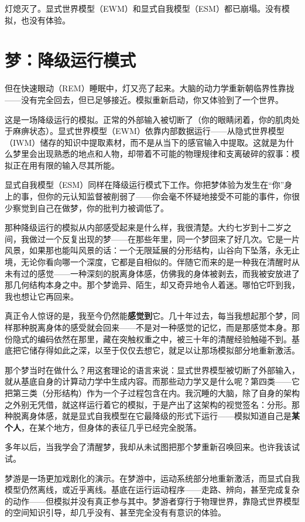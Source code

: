 \documentclass[11pt, twoside, openright]{book}
\begin{document}
灯熄灭了。显式世界模型（EWM）和显式自我模型（ESM）都已崩塌。没有模拟，也没有体验。

\section*{梦：降级运行模式}

但在快速眼动（REM）睡眠中，灯又亮了起来。大脑的动力学重新朝临界性靠拢------没有完全回去，但已足够接近。模拟重新启动，你又体验到了一个世界。

这是一场降级运行的模拟。正常的外部输入被切断了（你的眼睛闭着，你的肌肉处于麻痹状态）。显式世界模型（EWM）依靠内部数据运行------从隐式世界模型（IWM）储存的知识中提取素材，而不是从当下的感官输入中提取。这就是为什么梦里会出现熟悉的地点和人物，却带着不可能的物理规律和支离破碎的叙事：模拟正在用有限的输入尽其所能。

显式自我模型（ESM）同样在降级运行模式下工作。你把梦体验为发生在“你”身上的事，但你的元认知监督被削弱了------你会毫不怀疑地接受不可能的事件，你很少察觉到自己在做梦，你的批判力被调低了。

那种降级运行的模拟从内部感受起来是什么样，我很清楚。大约七岁到十二岁之间，我做过一个反复出现的梦------在那些年里，同一个梦回来了好几次。它是一片风景，如果那也能叫风景的话：一个无限延展的分形结构，山谷向下坠落，永无止境，无论你看向哪一个深度，它都是自相似的。伴随它而来的是一种我在清醒时从未有过的感觉------一种深刻的脱离身体感，仿佛我的身体被剥去，而我被安放进了那几何结构本身之中。那个梦诡异、陌生，却又奇异地令人着迷。哪怕它吓到我，我也想让它再回来。

真正令人惊讶的是，我至今仍然能\textbf{感觉到}它。几十年过去，每当我想起那个梦，同样那种脱离身体的感受就会回来------不是对一种感觉的记忆，而是那感觉本身。那份隐式的编码依然在那里，藏在突触权重之中，被三十年的清醒经验触碰不到。基底把它储存得如此之深，以至于仅仅去想它，就足以让那场模拟部分地重新激活。

那个梦当时在做什么？用这套理论的语言来说：显式世界模型被切断了外部输入，就从基底自身的计算动力学中生成内容。而那些动力学又是什么呢？第四类------它把第三类（分形结构）作为一个子过程包含在内。我沉睡的大脑，除了自身的架构之外别无凭借，就这样运行着它的模拟，于是产出了这架构的视觉签名：分形。那种脱离身体感，就是显式自我模型在它最降级的形式下运行------模拟知道自己是\textbf{某个人}，在某个地方，但身体的表征几乎已经完全脱落。

多年以后，当我学会了清醒梦，我却从未试图把那个梦重新召唤回来。也许我该试试。

梦游是一场更加戏剧化的演示。在梦游中，运动系统部分地重新激活，而显式自我模型仍然离线，或近乎离线。基底在运行运动程序------走路、辨向，甚至完成复杂的动作------但模拟并没有真正参与其中。梦游者穿行于物理世界，靠隐式世界模型的空间知识引导，却几乎没有、甚至完全没有有意识的体验。
\end{document}
